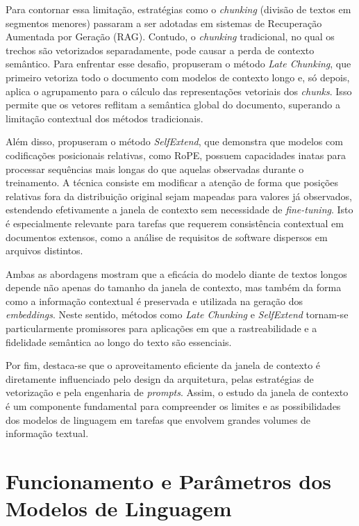 Para contornar essa limitação, estratégias como o \textit{chunking} (divisão de textos em segmentos menores) passaram a ser adotadas em sistemas de Recuperação Aumentada por Geração (RAG). Contudo, o \textit{chunking} tradicional, no qual os trechos são vetorizados separadamente, pode causar a perda de contexto semântico. Para enfrentar esse desafio,  propuseram o método \textit{Late Chunking}, que primeiro vetoriza todo o documento com modelos de contexto longo e, só depois, aplica o agrupamento para o cálculo das representações vetoriais dos \textit{chunks}. Isso permite que os vetores reflitam a semântica global do documento, superando a limitação contextual dos métodos tradicionais.

Além disso,  propuseram o método \textit{SelfExtend}, que demonstra que modelos com codificações posicionais relativas, como RoPE, possuem capacidades inatas para processar sequências mais longas do que aquelas observadas durante o treinamento. A técnica consiste em modificar a atenção de forma que posições relativas fora da distribuição original sejam mapeadas para valores já observados, estendendo efetivamente a janela de contexto sem necessidade de \textit{fine-tuning}. Isto é especialmente relevante para tarefas que requerem consistência contextual em documentos extensos, como a análise de requisitos de software dispersos em arquivos distintos.

Ambas as abordagens mostram que a eficácia do modelo diante de textos longos depende não apenas do tamanho da janela de contexto, mas também da forma como a informação contextual é preservada e utilizada na geração dos \textit{embeddings}. Neste sentido, métodos como \textit{Late Chunking} e \textit{SelfExtend} tornam-se particularmente promissores para aplicações em que a rastreabilidade e a fidelidade semântica ao longo do texto são essenciais.

Por fim, destaca-se que o aproveitamento eficiente da janela de contexto é diretamente influenciado pelo design da arquitetura, pelas estratégias de vetorização e pela engenharia de \textit{prompts}. Assim, o estudo da janela de contexto é um componente fundamental para compreender os limites e as possibilidades dos modelos de linguagem em tarefas que envolvem grandes volumes de informação textual.

\section{Funcionamento e Parâmetros dos Modelos de Linguagem}

